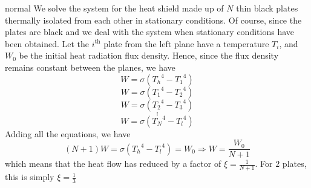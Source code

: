 \begin{solution}{normal}
We solve the system for the heat shield made up of $N$ thin black plates thermally isolated from each other in stationary conditions. Of course, since the plates are black and we deal with the system when stationary conditions have been obtained. Let the $i^{\text{th}}$ plate from the left plane have a temperature $T_i$, and $W_0$ be the initial heat radiation flux density. Hence, since the flux density remains constant between the planes, we have $$W = \sigma {({T_h}^4 - {T_1}^4)}$$ $$W = \sigma {({T_1}^4 - {T_2}^4)}$$ $$W = \sigma {({T_2}^4 - {T_3}^4)}$$ $$.$$ $$.$$ $$.$$ $$W = \sigma {({T_N}^4 - {T_l}^4)}$$ Adding all the equations, we have $$(N+1) W = \sigma{({T_h}^4-{T_l}^4)} = W_0 \Rightarrow W = \frac{W_0}{N+1}$$ which means that the heat flow has reduced by a factor of $\boxed{\xi=\frac{1}{N+1}}$. For $2$ plates, this is simply $\xi=\frac{1}{3}$
\end{solution}